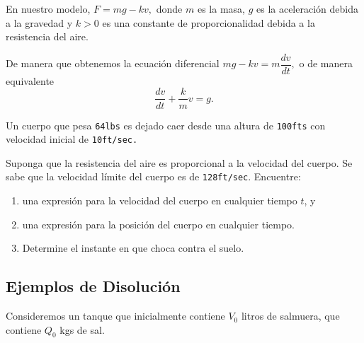 	En nuestro modelo, $F= mg - kv,$ donde $m$ es la masa, $g$ es la aceleración debida a la gravedad y $k>0$ es una constante de proporcionalidad debida a la resistencia del aire.



	De manera que obtenemos la ecuación diferencial $mg-kv=m\dfrac{dv}{dt},$ o de manera equivalente
	\[
		\label{bron:7.4}
		\dfrac{dv}{dt}+\dfrac{k}{m}v=g.
	\]
	



% 
%
%
% 

{}
	\begin{problema}
		Un cuerpo que pesa \texttt{64lbs} es dejado caer desde una altura de \texttt{100fts} con velocidad inicial de \texttt{10ft/sec.}
		
		Suponga que la resistencia del aire es proporcional a la velocidad del cuerpo. Se sabe que la velocidad límite del cuerpo es de \texttt{128ft/sec}. Encuentre:
		\begin{enumerate}
			\item una expresión para la velocidad del cuerpo en cualquier tiempo $t$,  y
			\item una expresión para la posición del cuerpo en cualquier tiempo.
			\item Determine el instante en que choca contra el suelo.
		\end{enumerate}
		
	\end{problema}
	


\subsection{Ejemplos de Disolución}


	Consideremos un tanque que inicialmente contiene $V_{0}$ litros de salmuera, que contiene $Q_{0}$ kgs de sal.\\
	

